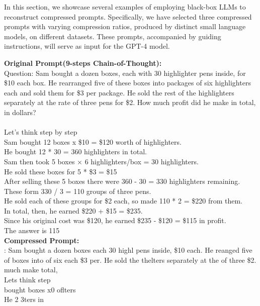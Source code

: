 In this section, we showcase several examples of employing black-box LLMs to reconstruct compressed prompts. Specifically, we have selected three compressed prompts with varying compression ratios, produced by distinct small language models, on different datasets. These prompts, accompanied by guiding instructions, will serve as input for the GPT-4 model.

\begin{figure*}[htb]
    \begin{tcolorbox}
    \textbf{Original Prompt(9-steps Chain-of-Thought):} \\
    Question: Sam bought a dozen boxes, each with 30 highlighter pens inside, for \$10 each box. He rearranged five of these boxes into packages of six highlighters each and sold them for \$3 per package. He sold the rest of the highlighters separately at the rate of three pens for \$2. How much profit did he make in total, in dollars?\\\\
    Let's think step by step\\
    Sam bought 12 boxes x \$10 = \$120 worth of highlighters.\\
    He bought 12 * 30 = 360 highlighters in total.\\
    Sam then took 5 boxes × 6 highlighters/box = 30 highlighters.\\
    He sold these boxes for 5 * \$3 = \$15\\
    After selling these 5 boxes there were 360 - 30 = 330 highlighters remaining.\\
    These form 330 / 3 = 110 groups of three pens.\\
    He sold each of these groups for \$2 each, so made 110 * 2 = \$220 from them.\\
    In total, then, he earned \$220 + \$15 = \$235.\\
    Since his original cost was \$120, he earned \$235 - \$120 = \$115 in profit.\\
    The answer is 115\\
    \textbf{Compressed Prompt:}\\
    : Sam bought a dozen boxes each 30 highl pens inside, \$10 each. He reanged five of boxes into of six each \$3 per. He sold the thelters separately at the of three \$2. much make total,\\
    Lets think step\\
     bought boxes x0 oflters\\
    He 2 3ters in\\

\end{tcolorbox}
\end{figure*}
